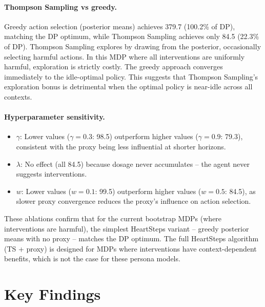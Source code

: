 \documentclass[11pt]{article}
\begin{document}
\paragraph{Thompson Sampling vs greedy.}
Greedy action selection (posterior means) achieves 379.7 (100.2\% of DP), matching the DP optimum, while Thompson Sampling achieves only 84.5 (22.3\% of DP). Thompson Sampling explores by drawing from the posterior, occasionally selecting harmful actions. In this MDP where all interventions are uniformly harmful, exploration is strictly costly. The greedy approach converges immediately to the idle-optimal policy. This suggests that Thompson Sampling's exploration bonus is detrimental when the optimal policy is near-idle across all contexts.

\paragraph{Hyperparameter sensitivity.}
\begin{itemize}
  \item $\gamma$: Lower values ($\gamma = 0.3$: 98.5) outperform higher values ($\gamma = 0.9$: 79.3), consistent with the proxy being less influential at shorter horizons.
  \item $\lambda$: No effect (all 84.5) because dosage never accumulates -- the agent never suggests interventions.
  \item $w$: Lower values ($w = 0.1$: 99.5) outperform higher values ($w = 0.5$: 84.5), as slower proxy convergence reduces the proxy's influence on action selection.
\end{itemize}

These ablations confirm that for the current bootstrap MDPs (where interventions are harmful), the simplest HeartSteps variant -- greedy posterior means with no proxy -- matches the DP optimum. The full HeartSteps algorithm (TS + proxy) is designed for MDPs where interventions have context-dependent benefits, which is not the case for these persona models.

\section{Key Findings}
\end{document}

